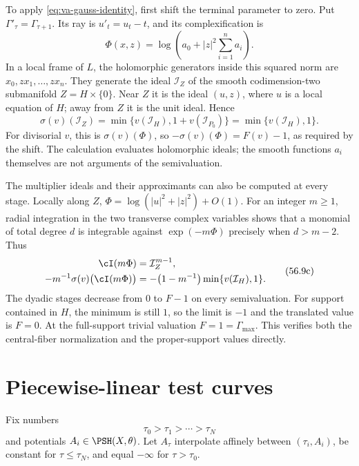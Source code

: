 \begin{example}
To apply \eqref{eq:va-gauss-identity}, first shift the terminal
parameter to zero. Put $\Gamma'_\tau=\Gamma_{\tau+1}$.
Its ray is $u'_t=u_t-t$, and its complexification is
\[
 \Phi(x,z)=\log\left(a_0+|z|^2\sum_{i=1}^n a_i\right).
\tag{56.9b}\label{eq:va-hyperplane-shifted-potential}
\]
In a local frame of $L$, the holomorphic generators inside this
squared norm are $x_0,zx_1,\ldots,zx_n$. They generate the ideal
$\mathcal I_Z$ of the smooth codimension-two submanifold
$Z=H\times\{0\}$. Near $Z$ it is the ideal $(u,z)$, where $u$
is a local equation of $H$; away from $Z$ it is the unit ideal.
Hence
\[
 \sigma(v)(\mathcal I_Z)
   =\min\{v(\mathcal I_H),1+v(\mathcal I_{P_0})\}
   =\min\{v(\mathcal I_H),1\}.
\]
For divisorial $v$, this is $\sigma(v)(\Phi)$, so
$-\sigma(v)(\Phi)=F(v)-1$, as required by the shift.
The calculation evaluates holomorphic ideals; the smooth functions
$a_i$ themselves are not arguments of the semivaluation.

The multiplier ideals and their approximants can also be computed
at every stage. Locally along $Z$,
$\Phi=\log(|u|^2+|z|^2)+O(1)$. For an integer $m\geq1$,
radial integration in the two transverse complex variables shows
that a monomial of total degree $d$ is integrable against
$\exp(-m\Phi)$ precisely when $d>m-2$. Thus
\[
 \begin{split}
 \cI(m\Phi)&=\mathcal I_Z^{m-1},\\
 -m^{-1}\sigma(v)\bigl(\cI(m\Phi)\bigr)
   &=-\bigl(1-m^{-1}\bigr)\min\{v(\mathcal I_H),1\}.
 \end{split}
\tag{56.9c}\label{eq:va-hyperplane-multiplier-stages}
\]
The dyadic stages decrease from $0$ to $F-1$ on every semivaluation.
For support contained in $H$, the minimum is still $1$, so the
limit is $-1$ and the translated value is $F=0$.
At the full-support trivial valuation $F=1=\Gamma_{\max}$.
This verifies both the central-fiber normalization and the
proper-support values directly.
\end{example}

\section{Piecewise-linear test curves}
\label{sec:va-pl}

Fix numbers
\[
                  \tau_0>\tau_1>\cdots>\tau_N
\]
and potentials $A_i\in\PSH(X,\theta)$.
Let $A_\tau$ interpolate affinely between
$(\tau_i,A_i)$, be constant for $\tau\leq\tau_N$, and equal
$-\infty$ for $\tau>\tau_0$.

